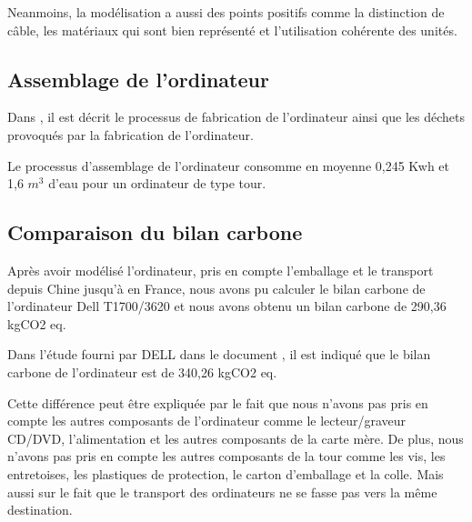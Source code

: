 Neanmoins, la modélisation a aussi des points positifs comme la distinction de câble, les matériaux qui sont bien représenté et l'utilisation cohérente des unités.

\subsection*{Assemblage de l'ordinateur}

Dans \citep{hischier2007electronic}, il est décrit le processus de fabrication de l'ordinateur ainsi que les déchets provoqués par la fabrication de l'ordinateur.

Le processus d'assemblage de l'ordinateur consomme en moyenne 0,245 Kwh et 1,6 $m^3$ d'eau pour un ordinateur de type tour. 

\subsection{Comparaison du bilan carbone}

Après avoir modélisé l'ordinateur, pris en compte l'emballage et le transport depuis Chine jusqu'à en France, nous avons pu calculer le bilan carbone de l'ordinateur Dell T1700/3620 et nous avons obtenu un bilan carbone de 290,36 kgCO2 eq.

Dans l'étude fourni par DELL dans le document \citep{dell2018carbon}, il est indiqué que le bilan carbone de l'ordinateur est de 340,26 kgCO2 eq.

Cette différence peut être expliquée par le fait que nous n'avons pas pris en compte les autres composants de l'ordinateur comme le lecteur/graveur CD/DVD, l'alimentation et les autres composants de la carte mère. De plus, nous n'avons pas pris en compte les autres composants de la tour comme les vis, les entretoises, les plastiques de protection, le carton d'emballage et la colle. Mais aussi sur le fait que le transport des ordinateurs ne se fasse pas vers la même destination.